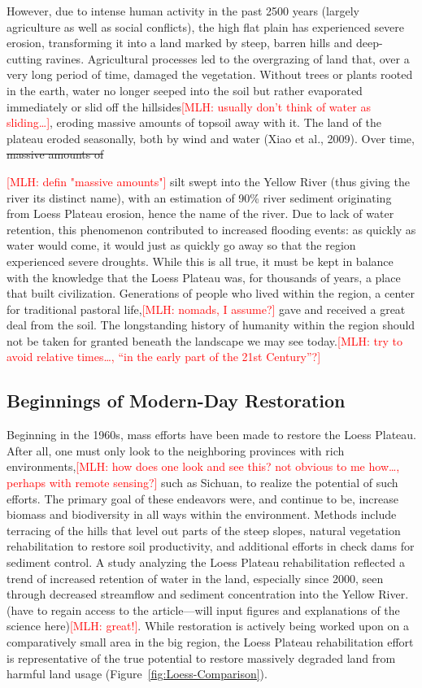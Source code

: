 \documentclass{book}\usepackage{knitr}
\newcommand{\red}[1]{\textcolor{red}{[MLH: #1]}}
\begin{document}
However, due to intense human activity in the past 2500 years (largely agriculture as well as social conflicts), the high flat plain has experienced severe erosion, transforming it into a land marked by steep, barren hills and deep-cutting ravines. Agricultural processes led to the overgrazing of land that, over a very long period of time, damaged the vegetation. Without trees or plants rooted in the earth, water no longer seeped into the soil but rather evaporated immediately or slid off the hillsides\red{usually don't think of water as sliding\ldots}, eroding massive amounts of topsoil away with it. The land of the plateau eroded seasonally, both by wind and water (Xiao et al., 2009). Over time, \st{massive amounts of}{\red{defin "massive amounts"} silt swept into the Yellow River (thus giving the river its distinct name), with an estimation of 90\% river sediment originating from Loess Plateau erosion, hence the name of the river. Due to lack of water retention, this phenomenon contributed to increased flooding events: as quickly as water would come, it would just as quickly go away so that the region experienced severe droughts. While this is all true, it must be kept in balance with the knowledge that the Loess Plateau was, for thousands of years, a place that built civilization. Generations of people who lived within the region, a center for traditional pastoral life,\red{nomads, I assume?} gave and received a great deal from the soil. The longstanding history of humanity within the region should not be taken for granted beneath the landscape we may see today.\red{try to avoid relative times\ldots, ``in the early part of the 21st Century''?}

\subsection{Beginnings of Modern-Day Restoration}

Beginning in the 1960s, mass efforts have been made to restore the Loess Plateau. After all, one must only look to the neighboring provinces with rich environments,\red{how does one look and see this? not obvious to me how\ldots, perhaps with remote sensing?} such as Sichuan, to realize the potential of such efforts. The primary goal of these endeavors were, and continue to be, increase biomass and biodiversity in all ways within the environment. Methods include terracing of the hills that level out parts of the steep slopes, natural vegetation rehabilitation to restore soil productivity, and additional efforts in check dams for sediment control. A study analyzing the Loess Plateau rehabilitation reflected a trend of increased retention of water in the land, especially since 2000, seen through decreased streamflow and sediment concentration into the Yellow River. (have to regain access to the article—will input figures and explanations of the science here)\red{great!}. While restoration is actively being worked upon on a comparatively small area in the big region, the Loess Plateau rehabilitation effort is representative of the true potential to restore massively degraded land from harmful land usage (Figure~\ref{fig:Loess-Comparison}).

}
\end{document}
